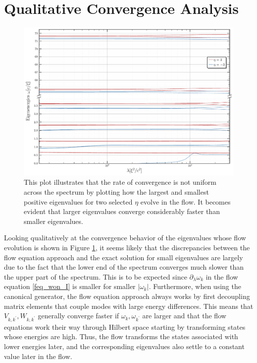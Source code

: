 \section{Qualitative Convergence Analysis}
\begin{figure}[H]
    \centering
    \includegraphics[width=\textwidth]{figures/plots/PDF/Convergence_analysis,N=40.pdf}
    \caption[Convergence behavior of the spectrum for selected $\eta$]{This plot illustrates that the rate of convergence is not uniform across the spectrum by plotting how the largest and smallest positive eigenvalues for two selected $\eta$ evolve in the flow. It becomes evident that larger eigenvalues converge considerably faster than smaller eigenvalues.}
    \label{ConvergenceRate}
\end{figure}
Looking qualitatively at the convergence behavior of the eigenvalues whose flow evolution is shown in Figure \ref{ConvergenceRate}, it seems likely that the discrepancies between the flow equation approach and the exact solution for small eigenvalues are largely due to the fact that the lower end of the spectrum converges much slower than the upper part of the spectrum. This is to be expected since $\partial_\lambda\omega_k$ in the flow equation \ref{feq_won_I} is smaller for smaller $|\omega_k|$. Furthermore, when using the canonical generator, the flow equation approach always works by first decoupling matrix elements that couple modes with large energy differences. This means that $V_{k,k^\prime},W_{k,k^\prime}$ generally converge faster if $\omega_k,\omega_{k^\prime}$ are larger and that the flow equations work their way through Hilbert space starting by transforming states whose energies are high. Thus, the flow transforms the states associated with lower energies later, and the corresponding eigenvalues also settle to a constant value later in the flow.

